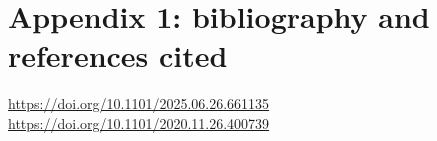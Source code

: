
\section{Appendix 1: bibliography and references cited}\label{sec:refs}

\noindent
\url{https://doi.org/10.1101/2025.06.26.661135}\\
\url{https://doi.org/10.1101/2020.11.26.400739}

